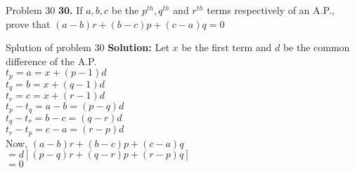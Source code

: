 \documentclass[aspectratio=1610,8pt]{beamer}
\begin{document}
\begin{frame}{Problem 30}
  \textbf{30.} If $a, b, c$ be the $p^{th}, q^{th}$ and $r^{th}$ terms respectively of an
  A.P., prove that $(a - b)r + (b - c)p + (c - a)q = 0$
\end{frame}
\begin{frame}{Splution of problem 30}
  \textbf{Solution:} Let $x$ be the first term and $d$ be the common difference
  of the A.P.\\
  $t_p = a = x + (p - 1)d$\\
  $t_q = b = x + (q - 1)d$\\
  $t_r = c = x + (r - 1)d$\\
  $t_p - t_q = a - b = (p - q)d$\\
  $t_q - t_r = b - c = (q - r)d$\\
  $t_r - t_p = c - a = (r - p)d$\\

  Now, $(a - b)r + (b - c)p + (c - a)q$\\
  $= d[(p - q)r + (q - r)p + (r - p)q]$\\
  $= 0$
\end{frame}
\end{document}
